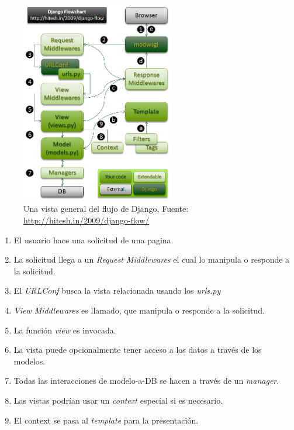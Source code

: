\begin{figure}[h]
  \begin{center}
    \includegraphics[width=0.6\textwidth]{figures/chapter5/DjangoFlow.png}
    \caption[El flujo de Django]{Una vista general del flujo de Django, Fuente: \url{http://hitesh.in/2009/django-flow/}}
  \end{center}
\end{figure}

\newpage

\begin{enumerate}
    \item El usuario hace una solicitud de una pagina.
    \item La solicitud llega a un {\it Request Middlewares} el cual lo manipula o
      responde a la solicitud.
    \item El {\it URLConf} busca la vista relacionada usando los {\it urls.py}
    \item {\it View Middlewares} es llamado, que manipula o responde a la
      solicitud.
    \item La función {\it view} es invocada.
    \item La vista puede opcionalmente tener acceso a los datos a través de los
        modelos.
    \item Todas las interacciones de modelo-a-DB se hacen a través de un {\it manager}.
    \item Las vistas podrían usar un {\it context} especial si es necesario.
    \item El context se pasa al {\it template} para la presentación.
\end{enumerate}

